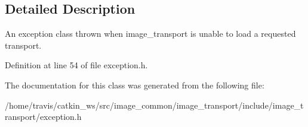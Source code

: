 \subsection{Detailed Description}
An exception class thrown when image\-\_\-transport is unable to load a requested transport. 

Definition at line 54 of file exception.\-h.



The documentation for this class was generated from the following file\-:\begin{DoxyCompactItemize}
\item 
/home/travis/catkin\-\_\-ws/src/image\-\_\-common/image\-\_\-transport/include/image\-\_\-transport/exception.\-h\end{DoxyCompactItemize}
